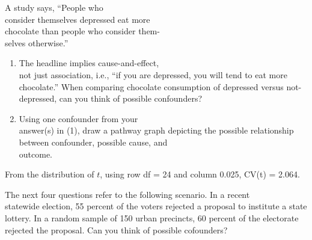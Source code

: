 \documentclass[11pt, chapterprefix=true]{scrbook}\usepackage[]{graphicx}\usepackage[]{color}
\begin{document}
\begin{exercises}
  \begin{exercise} %

A study says, ``People who \\ consider themselves depressed eat more \\ chocolate than people who consider them- \\ selves otherwise.''

\begin{enumerate}
\item The headline implies cause-and-effect, \\ not just association, i.e., ``if you are depressed, you will tend to eat more chocolate.''   When comparing chocolate consumption of depressed versus not- \\ depressed, can you think of possible confounders?
  \item Using one confounder from your \\ answer(s) in (1), draw a pathway graph depicting the possible relationship between confounder, possible cause, and \\ outcome.
\end{enumerate}
  \end{exercise}
  \begin{solution}  %


    From the distribution of $t$, using row df = 24 and column 0.025, CV(t) = 2.064.
  \end{solution}


  \begin{exercise} %

The next four questions refer to the following scenario.  In a recent \\ statewide election, 55 percent of the voters rejected a proposal to institute a state lottery.  In a random sample of 150 urban precincts, 60 percent of the electorate rejected the proposal.  Can you think of possible cofounders?



\end{exercise}
\end{exercises}
\end{document}

